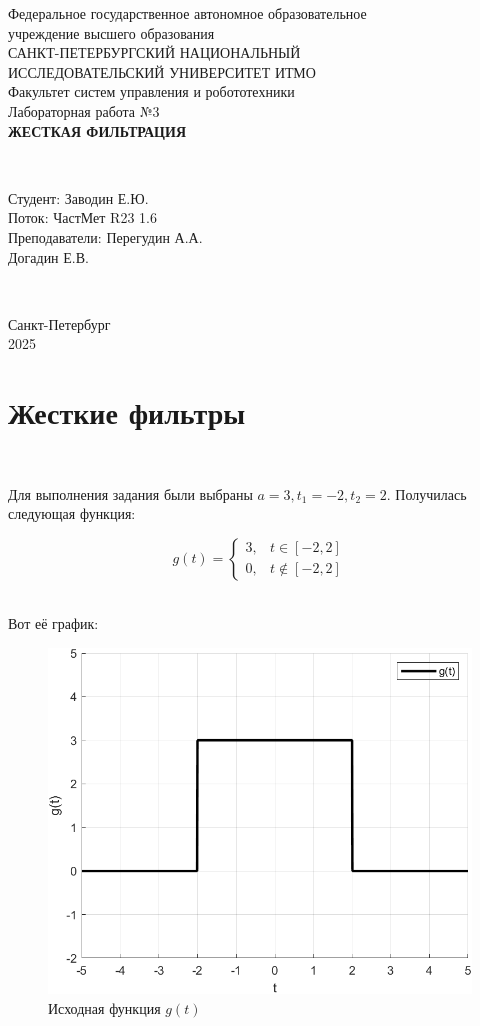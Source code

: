 \documentclass[a4paper]{article}
\begin{document}
\begin{titlepage}
    \begin{center}
        Федеральное государственное автономное образовательное \\ учреждение высшего образования \\[6pt]
        САНКТ-ПЕТЕРБУРГСКИЙ НАЦИОНАЛЬНЫЙ \\ ИССЛЕДОВАТЕЛЬСКИЙ УНИВЕРСИТЕТ ИТМО \\[16pt]
        Факультет систем управления и робототехники \\[26em]
        Лабораторная работа №3 \\[0.5em]
        \textbf{ЖЕСТКАЯ ФИЛЬТРАЦИЯ}
    \end{center}\,\\[10em]
    \begin{flushright}
        Студент: Заводин Е.Ю.\\
        Поток: ЧастМет R23 1.6 \\[0.5em]
        Преподаватели: Перегудин А.А.\\
        Догадин Е.В.
    \end{flushright}\,\\[6em]
    \begin{center}
        {\small Санкт-Петербург \\ 2025}
    \end{center}
\end{titlepage}
\setcounter{page}{2}
\tableofcontents\newpage

\section{Жесткие фильтры}\

Для выполнения задания были выбраны $a = 3, t_1 = -2, t_2 = 2$. Получилась следующая функция:

$$
g(t) = 
\begin{cases}
    3, & t \in [-2, 2] \\
    0, & t \notin [-2, 2]
\end{cases}
$$\

Вот её график:

\begin{figure}[H]
    \centering
    \includegraphics[width=0.5\linewidth]{g(t).png}
    \caption{Исходная функция $g(t)$}
    \label{fig:enter-label}
\end{figure}\
\end{document}
